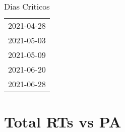 \documentclass[
]{article}
\author{}
\date{\vspace{-2.5em}}
\begin{document}
\begin{table}[H]
    \centering
    \caption{Dias Criticos}
    \label{tab:dias_criticos}
    \begin{tabular}{c}
        \toprule
          2021-04-28 \\
          2021-05-03 \\
          2021-05-09 \\ 
          2021-06-20 \\
          2021-06-28 \\
        \bottomrule
    \end{tabular}
\end{table}

\tableofcontents
\newpage
\section{Total RTs vs PA}
\end{document}
